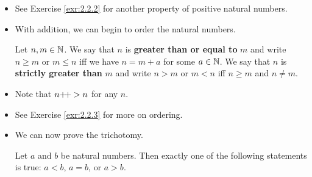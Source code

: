 \documentclass[../main.tex]{subfiles}
\begin{document}
\begin{itemize}
\begin{prop}
        If $a$ is positive and $b$ is a natural number, then $a+b$ is positive (and hence $b+a$ is also by Proposition \ref{prp:commutativity}).
        \begin{proof}
            We induct on $b$ (keeping $a$ fixed). In the base case, if $b=0$, then $a+0=a$ (a positive number) by Lemma \ref{lem:nplus0}. Suppose inductively that $a+b$ is positive. Then $a+(b\pplus)=(a+b)\pplus$ by Lemma \ref{lem:nplusmpplus}, and $(a+b)\pplus$ is positive by Axiom \ref{axm:0NotSuccessor} --- $a+(b\pplus)$ is equal to the successor of a natural number, and the successor of a natural number is never 0, thus always positive. This closes the induction.
        \end{proof}
    \end{prop}
    \begin{cly}\label{cly:AplusBequals0}
        If $a,b\in\N$ and $a+b=0$, then $a=0$ and $b=0$.
        \begin{proof}
            Suppose for the sake of contradiction that $a\neq 0$ or $b\neq 0$. If $a\neq 0$, then $a$ is positive, and hence $a+b=0$ is positive by Proposition \ref{prp:AplusBpositive}, a contradiction. Similarly, if $b\neq 0$, then $b$ is positive, and hence $a+b=0$ is positive by Proposition \ref{prp:AplusBpositive}, a contradiction. Thus, $a$ and $b$ must both be zero.
        \end{proof}
    \end{cly}
    \item See Exercise \ref{exr:2.2.2} for another property of positive natural numbers.
    \item With addition, we can begin to order the natural numbers.
    \begin{defn}\label{dfn:ordering}
        Let $n,m\in\mathbb{N}$. We say that $n$ is \textbf{greater than or equal to} $m$ and write $n\geq m$ or $m\leq n$ iff we have $n=m+a$ for some $a\in\mathbb{N}$. We say that $n$ is \textbf{strictly greater than} $m$ and write $n>m$ or $m<n$ iff $n\geq m$ and $n\neq m$.
    \end{defn}
    \item Note that $n{+\!+}>n$ for any $n$.
    \item See Exercise \ref{exr:2.2.3} for more on ordering.
    \item We can now prove the trichotomy.
    \begin{prop}\label{prp:trichotomy}
        Let $a$ and $b$ be natural numbers. Then exactly one of the following statements is true: $a<b$, $a=b$, or $a>b$.

\end{prop}
\end{itemize}
\end{document}

